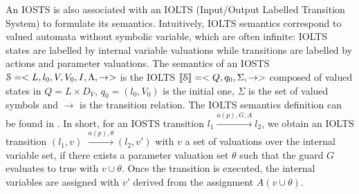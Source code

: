 An IOSTS is also associated with an IOLTS (Input/Output Labelled
Transition System) to formulate its semantics. Intuitively, IOLTS
semantics correspond to valued automata without symbolic variable,
which are often infinite: IOLTS states are labelled by internal
variable valuations while transitions are labelled by actions and
parameter valuations. The semantics of an IOSTS
$\EuScript{S}=<L,l_0,V,V_0,I,\Lambda,\rightarrow>$ is the IOLTS
$\llbracket \EuScript{S}\rrbracket = <Q,q_0,\Sigma,\rightarrow>$
composed of valued states in $Q = L \times D_V$, $q_0=(l_0,V_0)$
is the initial one, $\Sigma$ is the set of valued symbols and
$\rightarrow$ is the transition relation. The IOLTS semantics
definition can be found in \cite{FTW05}. In short, for an
IOSTS transition $l_1 \xrightarrow{a(p),G,A}l_2$, we obtain an
IOLTS transition $(l_1,v)$ $\xrightarrow{a(p),\theta} (l_2,v')$
with $v$ a set of valuations over the internal variable set, if
there exists a parameter valuation set $\theta$ such that the
guard $G$ evaluates to true with $v \cup \theta$. Once the
transition is executed, the internal variables are assigned with
$v'$ derived from the assignment $A(v \cup \theta)$.
